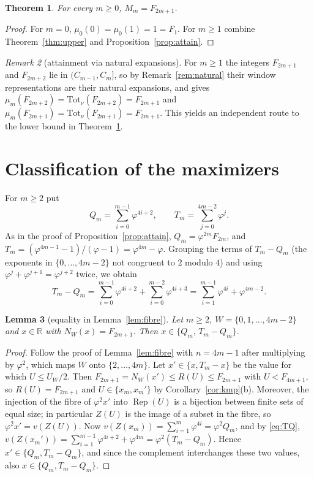 \documentclass[11pt]{amsart}
\newtheorem{theorem}{Theorem}[section]
\newtheorem{lemma}[theorem]{Lemma}
\theoremstyle{definition}
\theoremstyle{remark}
\newtheorem{remark}[theorem]{Remark}
\numberwithin{equation}{section}
\newcommand{\R}{\mathbb{R}}
\newcommand{\val}{v}
\newcommand{\Rep}{\operatorname{Rep}}
\begin{document}
\begin{theorem}\label{thm:max}
For every $m\ge0$, $M_m=F_{2m+1}$.
\end{theorem}

\begin{proof}
For $m=0$, $\mu_0(0)=\mu_0(1)=1=F_1$. For $m\ge1$ combine Theorem~\ref{thm:upper} and
Proposition~\ref{prop:attain}.
\end{proof}

\begin{remark}[attainment via natural expansions]\label{rem:dvl43}
For $m\ge1$ the integers $F_{2m+1}$ and $F_{2m+2}$ lie in $(C_{m-1},C_m]$, so by
Remark~\ref{rem:natural} their window representations are their natural expansions, and
\cite[Theorem~4.3]{DekkingVanLoon2024} gives
$\mu_m(F_{2m+2})=\mathrm{Tot}_\nu(F_{2m+2})=F_{2m+1}$ and
$\mu_m(F_{2m+1})=\mathrm{Tot}_\nu(F_{2m+1})=F_{2m+1}$. This yields an independent route to the lower
bound in Theorem~\ref{thm:max}.
\end{remark}

\section{Classification of the maximizers}\label{sec:argmax}

For $m\ge2$ put
\[
  Q_m=\sum_{i=0}^{m-1}\varphi^{4i+2},\qquad T_m=\sum_{j=0}^{4m-2}\varphi^{j}.
\]
As in the proof of Proposition~\ref{prop:attain}, $Q_m=\varphi^{2m}F_{2m}$, and
$T_m=(\varphi^{4m-1}-1)/(\varphi-1)=\varphi^{4m}-\varphi$. Grouping the terms of $T_m-Q_m$ (the
exponents in $\{0,\dots,4m-2\}$ not congruent to $2$ modulo $4$) and using
$\varphi^{j}+\varphi^{j+1}=\varphi^{j+2}$ twice, we obtain
\begin{equation}\label{eq:TQ}
  T_m-Q_m=\sum_{i=0}^{m-1}\varphi^{4i+2}+\sum_{i=0}^{m-2}\varphi^{4i+3}
  =\sum_{i=1}^{m-1}\varphi^{4i}+\varphi^{4m-2}.
\end{equation}

\begin{lemma}[equality in Lemma~\ref{lem:fibre}]\label{lem:equality}
Let $m\ge2$, $W=\{0,1,\dots,4m-2\}$ and $x\in\R$ with $N_W(x)=F_{2m+1}$. Then
$x\in\{Q_m,\,T_m-Q_m\}$.
\end{lemma}

\begin{proof}
Follow the proof of Lemma~\ref{lem:fibre} with $n=4m-1$ after multiplying by $\varphi^2$, which maps
$W$ onto $\{2,\dots,4m\}$. Let $x'\in\{x,T_m-x\}$ be the value for which $U\le U_W/2$. Then
$F_{2m+1}=N_W(x')\le R(U)\le F_{2m+1}$ with $U<F_{4m+1}$, so $R(U)=F_{2m+1}$ and $U\in\{x_m,x_m'\}$ by
Corollary~\ref{cor:kmp}(b). Moreover, the injection of the fibre of $\varphi^2x'$ into $\Rep(U)$ is a
bijection between finite sets of equal size; in particular $Z(U)$ is the image of a subset in the
fibre, so $\varphi^2x'=\val(Z(U))$. Now $\val(Z(x_m))=\sum_{i=1}^m\varphi^{4i}=\varphi^2Q_m$, and by
\eqref{eq:TQ}, $\val(Z(x_m'))=\sum_{i=1}^{m-1}\varphi^{4i+2}+\varphi^{4m}=\varphi^2(T_m-Q_m)$. Hence
$x'\in\{Q_m,T_m-Q_m\}$, and since the complement interchanges these two values, also
$x\in\{Q_m,T_m-Q_m\}$.
\end{proof}
\end{document}
